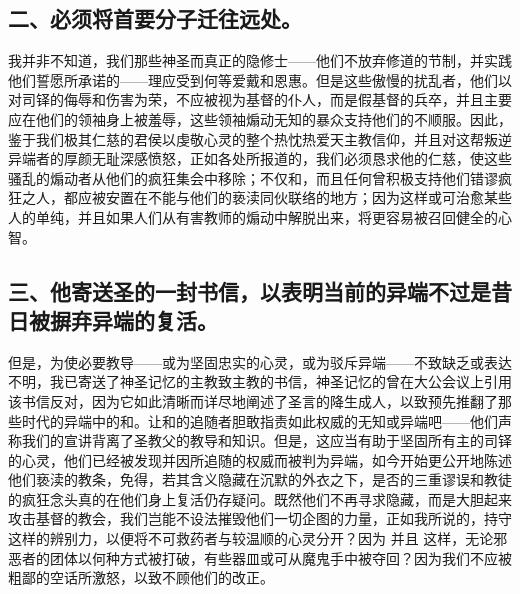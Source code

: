 
\subsection{二、必须将首要分子迁往远处。}

我并非不知道，我们那些神圣而真正的隐修士——他们不放弃修道的节制，并实践他们誓愿所承诺的——理应受到何等爱戴和恩惠。但是这些傲慢的扰乱者，他们以对司铎的侮辱和伤害为荣，不应被视为基督的仆人，而是假基督的兵卒，并且主要应在他们的领袖身上被羞辱，这些领袖煽动无知的暴众支持他们的不顺服。因此，鉴于我们极其仁慈的君侯以虔敬心灵的整个热忱热爱天主教信仰，并且对这帮叛逆异端者的厚颜无耻深感愤怒，正如各处所报道的，我们必须恳求他的仁慈，使这些骚乱的煽动者从他们的疯狂集会中移除；不仅和，而且任何曾积极支持他们错谬疯狂之人，都应被安置在不能与他们的亵渎同伙联络的地方；因为这样或可治愈某些人的单纯，并且如果人们从有害教师的煽动中解脱出来，将更容易被召回健全的心智。\par


\subsection{三、他寄送圣的一封书信，以表明当前的异端不过是昔日被摒弃异端的复活。}

但是，为使必要教导——或为坚固忠实的心灵，或为驳斥异端——不致缺乏或表达不明，我已寄送了神圣记忆的主教致主教的书信，神圣记忆的曾在大公会议上引用该书信反对，因为它如此清晰而详尽地阐述了圣言的降生成人，以致预先推翻了那些时代的异端中的和。让和的追随者胆敢指责如此权威的无知或异端吧——他们声称我们的宣讲背离了圣教父的教导和知识。但是，这应当有助于坚固所有主的司铎的心灵，他们已经被发现并因所追随的权威而被判为异端，如今开始更公开地陈述他们亵渎的教条，免得，若其含义隐藏在沉默的外衣之下，是否的三重谬误和教徒的疯狂念头真的在他们身上复活仍存疑问。既然他们不再寻求隐藏，而是大胆起来攻击基督的教会，我们岂能不设法摧毁他们一切企图的力量，正如我所说的，持守这样的辨别力，以便将不可救药者与较温顺的心灵分开？因为 并且 这样，无论邪恶者的团体以何种方式被打破，有些器皿或可从魔鬼手中被夺回？因为我们不应被粗鄙的空话所激怒，以致不顾他们的改正。\par

